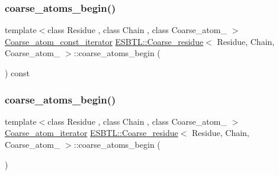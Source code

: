 \mbox{\label{group__grp__iters_gac0e520e0a924be52cfdfae8921a21d21}} 
\subsubsection{\texorpdfstring{coarse\+\_\+atoms\+\_\+begin()}{coarse\_atoms\_begin()}\hspace{0.1cm}{\footnotesize\ttfamily [1/4]}}
{\footnotesize\ttfamily template$<$class Residue , class Chain , class Coarse\+\_\+atom\+\_\+ $>$ \\
\hyperlink{group__grp__iters_ga5a4a865846cdde342538df7fc03c80ce}{Coarse\+\_\+atom\+\_\+const\+\_\+iterator} \hyperlink{classESBTL_1_1Coarse__residue}{E\+S\+B\+T\+L\+::\+Coarse\+\_\+residue}$<$ Residue, Chain, Coarse\+\_\+atom\+\_\+ $>$\+::coarse\+\_\+atoms\+\_\+begin (\begin{DoxyParamCaption}{ }\end{DoxyParamCaption}) const\hspace{0.3cm}{\ttfamily [inline]}}

\mbox{\label{group__grp__iters_gab001b6ad15d74ee2879ccc4669e52962}} 
\subsubsection{\texorpdfstring{coarse\+\_\+atoms\+\_\+begin()}{coarse\_atoms\_begin()}\hspace{0.1cm}{\footnotesize\ttfamily [2/4]}}
{\footnotesize\ttfamily template$<$class Residue , class Chain , class Coarse\+\_\+atom\+\_\+ $>$ \\
\hyperlink{group__grp__iters_ga09a38741d50d3b7296dae83eb0911e49}{Coarse\+\_\+atom\+\_\+iterator} \hyperlink{classESBTL_1_1Coarse__residue}{E\+S\+B\+T\+L\+::\+Coarse\+\_\+residue}$<$ Residue, Chain, Coarse\+\_\+atom\+\_\+ $>$\+::coarse\+\_\+atoms\+\_\+begin (\begin{DoxyParamCaption}{ }\end{DoxyParamCaption})\hspace{0.3cm}{\ttfamily [inline]}}

